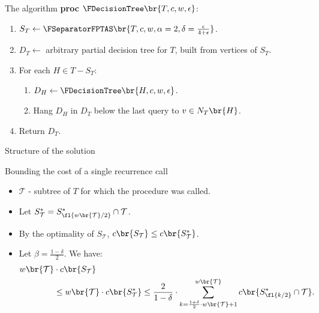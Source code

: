 \begin{frame}{The algorithm}
\textbf{proc} $\FDecisionTree\br{T,c,w,\epsilon}$:
\begin{enumerate}
    \item $S_T\gets\FSeparatorFPTAS\br{T, c, w, \alpha=2, \delta = \frac{\epsilon}{4+\epsilon}}$.
    \item $D_T\gets$ arbitrary partial decision tree for $T$, built from vertices of $S_T$.
    \item For each $H\in T-S_T$:
    \begin{enumerate}
        \item $D_H\gets\FDecisionTree\br{H,c,w,\epsilon}$.
        \item Hang $D_H$ in $D_T$ below the last query to $v\in N_T\br{H}$.
    \end{enumerate}
    \item Return $D_T$.
\end{enumerate}
\end{frame}

\begin{frame}{Structure of the solution}

\end{frame}

\begin{frame}{Bounding the cost of a single recurrence call}
\begin{itemize}
    \item $\mathcal{T}$ - subtree of $T$ for which the procedure was called.
    \pause
    \item Let $S_{\mathcal{T}}^*=S_{\fl{w\br{\mathcal{T}}/2}}^*\cap\mathcal{T}$. 
    \pause
    \item By the optimality of $S_{\mathcal{T}}$, $c\br{S_{\mathcal{T}}}\leq c\br{S_{\mathcal{T}}^*}$.
    \pause
    \item Let $\beta=\frac{1-\delta}{2}$. We have:
    \pause
            \begin{align*}
                w\br{\mathcal{T}}&\cdot c\br{S_{\mathcal{T}}}
                \\&\leq 
                w\br{\mathcal{T}}\cdot c\br{S_{\mathcal{T}}^*}\leq \frac{2}{1-\delta}\cdot \sum_{k=\frac{1+\delta}{2}\cdot w\br{\mathcal{T}}+1}^{w\br{\mathcal{T}}}c\br{S_{\fl{k/2}}^*\cap \mathcal{T}}.
            \end{align*}
\end{itemize}
\end{frame}


